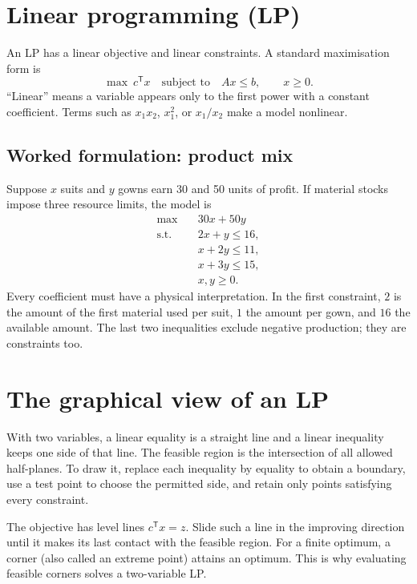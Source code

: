 \documentclass[11pt,a4paper]{article}
\newcommand{\T}{\mathsf{T}}
\begin{document}
\section{Linear programming (LP)}
An LP has a linear objective and linear constraints. A standard maximisation form is
\[
 \max\ c^\T x\quad\text{subject to}\quad Ax\leq b,\qquad x\geq0.
\]
``Linear'' means a variable appears only to the first power with a constant coefficient. Terms such as $x_1x_2$, $x_1^2$, or $x_1/x_2$ make a model nonlinear.

\subsection{Worked formulation: product mix}
Suppose $x$ suits and $y$ gowns earn 30 and 50 units of profit. If material stocks impose three resource limits, the model is
\[
\begin{aligned}
 \max\quad&30x+50y\\
 \text{s.t.}\quad&2x+y\leq16,\\
 &x+2y\leq11,\\
 &x+3y\leq15,\\
 &x,y\geq0.
\end{aligned}
\]
Every coefficient must have a physical interpretation. In the first constraint, $2$ is the amount of the first material used per suit, $1$ the amount per gown, and $16$ the available amount. The last two inequalities exclude negative production; they are constraints too.

\section{The graphical view of an LP}
With two variables, a linear equality is a straight line and a linear inequality keeps one side of that line. The feasible region is the intersection of all allowed half-planes. To draw it, replace each inequality by equality to obtain a boundary, use a test point to choose the permitted side, and retain only points satisfying every constraint.

The objective has level lines $c^\T x=z$. Slide such a line in the improving direction until it makes its last contact with the feasible region. For a finite optimum, a corner (also called an extreme point) attains an optimum. This is why evaluating feasible corners solves a two-variable LP.
\end{document}

